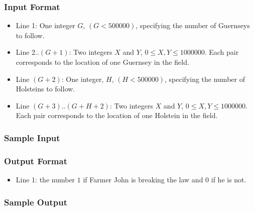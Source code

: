 \subsubsection{Input Format}
\begin{itemize}
	\item Line 1: One integer $G$, $(G < 500000)$, specifying the number of Guernseys to follow.
	\item Line 2..$(G+1)$: Two integers $X$ and $Y$, $0 \leq X,Y \leq 1000000$.
		Each pair corresponds to the location of one Guernsey in the field.
	\item Line $(G+2)$: One integer, $H$, $(H < 500000)$, specifying the number of Holsteins to follow. 
	\item Line $(G+3)$..$(G+H+2)$: Two integers $X$ and $Y$, $0 \leq X,Y \leq 1000000$.
		Each pair corresponds to the location of one Holstein in the field.
\end{itemize}

\subsubsection{Sample Input}

\subsubsection{Output Format}
\begin{itemize}
	\item Line 1: the number $1$ if Farmer John is breaking the law and $0$ if he is not.
\end{itemize}

\subsubsection{Sample Output}
